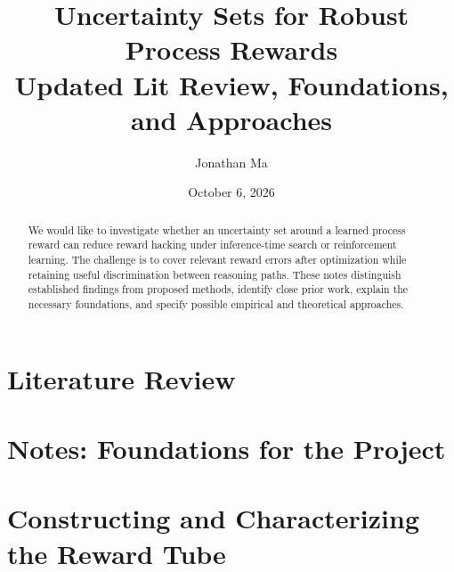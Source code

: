 \documentclass[11pt]{article}
\title{\textbf{Uncertainty Sets for Robust Process Rewards}\\
\large Updated Lit Review, Foundations, and Approaches}
\author{Jonathan Ma}
\date{October 6, 2026}
\begin{document}
\maketitle
\begin{abstract}
We would like to investigate whether an uncertainty set around a learned process reward
can reduce reward hacking under inference-time search or reinforcement learning.
The challenge is to cover relevant reward errors after optimization while
retaining useful discrimination between reasoning paths. These notes distinguish
established findings from proposed methods, identify close prior work, explain
the necessary foundations, and specify possible empirical and theoretical approaches.
\end{abstract}
\tableofcontents
\clearpage
\part{Literature Review}

\clearpage
\part{Notes: Foundations for the Project}

\clearpage
\part{Constructing and Characterizing the Reward Tube}

\clearpage
{}

\end{document}
